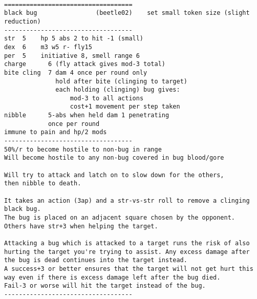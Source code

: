 \

\pagebreak[1]
\tiny \begin{samepage} \begin{verbatim}
===================================
black bug                (beetle02)    set small token size (slight reduction)
-----------------------------------
str  5    hp 5 abs 2 to hit -1 (small)
dex  6    m3 w5 r- fly15
per  5    initiative 8, smell range 6
charge      6 (fly attack gives mod-3 total)
bite cling  7 dam 4 once per round only
              hold after bite (clinging to target)
              each holding (clinging) bug gives:
                  mod-3 to all actions
                  cost+1 movement per step taken
nibble      5-abs when held dam 1 penetrating
            once per round
immune to pain and hp/2 mods
-----------------------------------
50%/r to become hostile to non-bug in range
Will become hostile to any non-bug covered in bug blood/gore

Will try to attack and latch on to slow down for the others,
then nibble to death.

It takes an action (3ap) and a str-vs-str roll to remove a clinging black bug.
The bug is placed on an adjacent square chosen by the opponent.
Others have str+3 when helping the target.

Attacking a bug which is attacked to a target runs the risk of also
hurting the target you're trying to assist. Any excess damage after
the bug is dead continues into the target instead.
A success+3 or better ensures that the target will not get hurt this
way even if there is excess damage left after the bug died.
Fail-3 or worse will hit the target instead of the bug.
-----------------------------------
\end{verbatim} \end{samepage} \normalsize

\

